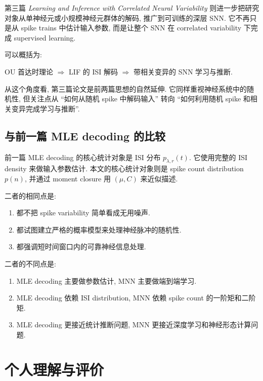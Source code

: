 \documentclass[oneside]{ctexart}
\begin{document}
第三篇 \textit{Learning and Inference with Correlated Neural Variability} 则进一步把研究对象从单神经元或小规模神经元群体的解码, 推广到可训练的深层 SNN. 它不再只是从 spike trains 中估计输入参数, 而是让整个 SNN 在 correlated variability 下完成 supervised learning.

可以概括为:

\begin{center}
    OU 首达时理论 $\Longrightarrow$ LIF 的 ISI 解码 $\Longrightarrow$ 带相关变异的 SNN 学习与推断.
\end{center}

从这个角度看, 第三篇论文是前两篇思想的自然延伸. 它同样重视神经系统中的随机性, 但关注点从 ``如何从随机 spike 中解码输入'' 转向 ``如何利用随机 spike 和相关变异完成学习与推断''.

\subsection{与前一篇 MLE decoding 的比较}

前一篇 MLE decoding 的核心统计对象是 ISI 分布 $p_{\lambda,r}(t)$. 它使用完整的 ISI density 来做输入参数估计. 本文的核心统计对象则是 spike count distribution $p(n)$, 并通过 moment closure 用 $(\mu,C)$ 来近似描述.

二者的相同点是:

\begin{enumerate}[(1)]
    \item 都不把 spike variability 简单看成无用噪声.
    \item 都试图建立严格的概率模型来处理神经脉冲的随机性.
    \item 都强调短时间窗口内的可靠神经信息处理.
\end{enumerate}

二者的不同点是:

\begin{enumerate}[(1)]
    \item MLE decoding 主要做参数估计, MNN 主要做端到端学习.
    \item MLE decoding 依赖 ISI distribution, MNN 依赖 spike count 的一阶矩和二阶矩.
    \item MLE decoding 更接近统计推断问题, MNN 更接近深度学习和神经形态计算问题.
\end{enumerate}

\section{个人理解与评价}
\end{document}
